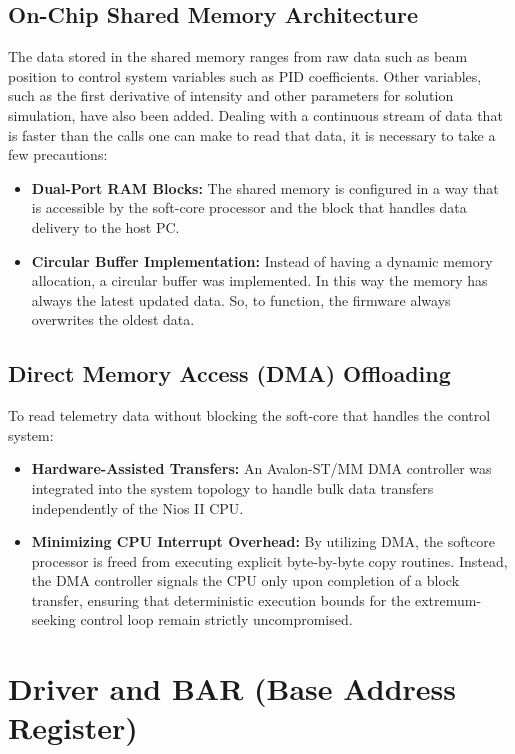 \subsection{On-Chip Shared Memory Architecture}
The data stored in the shared memory ranges from raw data such as beam position to control system variables such as PID coefficients. 
Other variables, such as the first derivative of intensity and other parameters for solution simulation, have also been added.
Dealing with a continuous stream of data that is faster than the calls one can make to read that data, it is necessary to take a few precautions:
\begin{itemize}
    \item \textbf{Dual-Port RAM Blocks:} The shared memory is configured in a way that is accessible by the soft-core processor and the block that handles data delivery to the host PC.
    \item \textbf{Circular Buffer Implementation:} Instead of having a dynamic memory allocation, a circular buffer was implemented. In this way the memory has always the latest updated data. So, to function, the firmware always overwrites the oldest data.
\end{itemize}

\subsection{Direct Memory Access (DMA) Offloading}

To read telemetry data without blocking the soft-core that handles the control system:
\begin{itemize}
    \item \textbf{Hardware-Assisted Transfers:} An Avalon-ST/MM DMA controller was integrated into the system topology to handle bulk data transfers independently of the Nios II CPU.
    \item \textbf{Minimizing CPU Interrupt Overhead:} By utilizing DMA, the softcore processor is freed from executing explicit byte-by-byte copy routines. Instead, the DMA controller signals the CPU only upon completion of a block transfer, ensuring that deterministic execution bounds for the extremum-seeking control loop remain strictly uncompromised.
\end{itemize}

\section{Driver and BAR (Base Address Register)}

